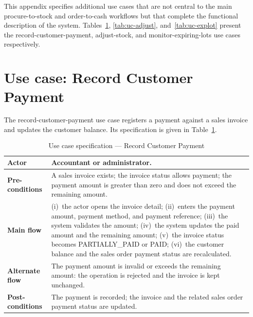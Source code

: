 \label{appendix:usecase}
This appendix specifies additional use cases that are not central to the main
procure-to-stock and order-to-cash workflows but that complete the functional
description of the system. Tables~\ref{tab:uc-payment}, \ref{tab:uc-adjust},
and~\ref{tab:uc-explot} present the record-customer-payment, adjust-stock, and
monitor-expiring-lots use cases respectively.

\section*{Use case: Record Customer Payment}
The record-customer-payment use case registers a payment against a sales invoice
and updates the customer balance. Its specification is given in
Table~\ref{tab:uc-payment}.
\begin{table}[H]\centering
\caption{Use case specification --- Record Customer Payment}
\label{tab:uc-payment}
\begin{tabular}{|p{3cm}|p{11cm}|}
\hline
\textbf{Actor} & Accountant or administrator. \\ \hline
\textbf{Pre-conditions} & A sales invoice exists; the invoice status allows payment; the payment amount is greater than zero and does not exceed the remaining amount. \\ \hline
\textbf{Main flow} & (i)~the actor opens the invoice detail; (ii)~enters the payment amount, payment method, and payment reference; (iii)~the system validates the amount; (iv)~the system updates the paid amount and the remaining amount; (v)~the invoice status becomes PARTIALLY\_PAID or PAID; (vi)~the customer balance and the sales order payment status are recalculated. \\ \hline
\textbf{Alternate flow} & The payment amount is invalid or exceeds the remaining amount: the operation is rejected and the invoice is kept unchanged. \\ \hline
\textbf{Post-conditions} & The payment is recorded; the invoice and the related sales order payment status are updated. \\ \hline
\end{tabular}
\end{table}

